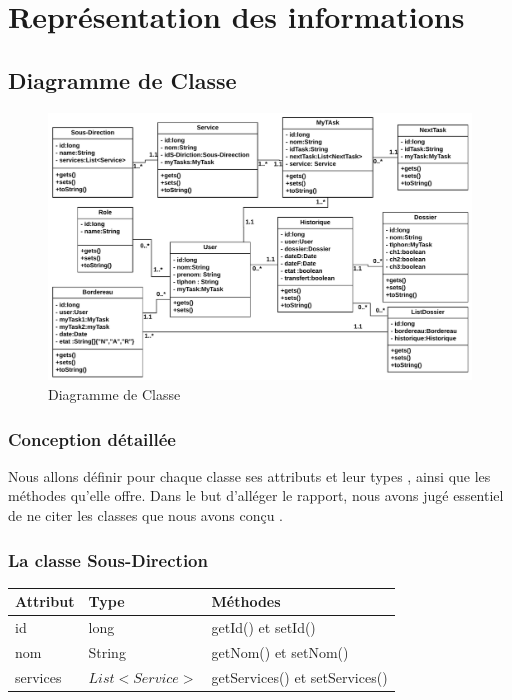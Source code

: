  \section{ Représentation des informations }
 \subsection{Diagramme de Classe}
\begin{figure}[H]
	\centering
	\includegraphics[width=1\linewidth,height=0.6\paperheight]{images/class01}
	\caption{Diagramme de Classe}
	\label{fig:class01}
\end{figure}

  \subsubsection{Conception détaillée} 
Nous allons définir pour chaque classe ses attributs et leur types , ainsi que les méthodes qu’elle offre. Dans le but d’alléger le rapport, nous avons jugé essentiel de ne citer  les classes que nous avons conçu  .
 
 

\subsubsection*{La classe  Sous-Direction}
\begin{table}[H]
  \centering\setlength\tabcolsep{0.8cm}
	\begin{tabular}{|l|l|l|}
		\hline
		\textbf{Attribut}  & \textbf{Type} & \multicolumn{1}{l|}{\textbf{Méthodes}} \\ \hline
	
		id & long & getId() et setId()\\ \cline{1-2}
		nom & String  & getNom() et setNom() \\ \cline{1-2}
	services	& $ List<Service> $ & getServices() et setServices()   \\ \hline
	\end{tabular}
\end{table}
